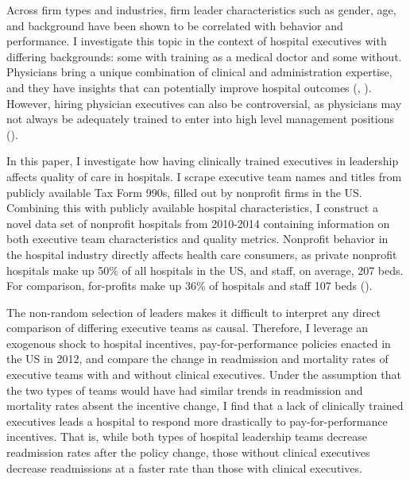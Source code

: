 \documentclass[12pt]{article}
\begin{document}
	\onehalfspacing
	
	\newpage

    Across firm types and industries, firm leader characteristics such as gender, age, and background have been shown to be correlated with behavior and performance. I investigate this topic in the context of hospital executives with differing backgrounds: some with training as a medical doctor and some without. Physicians bring a unique combination of clinical and administration expertise, and they have insights that can potentially improve hospital outcomes (\cite{Stajduhar_2023}, \cite{Ahmed_2022}). However, hiring physician executives can also be controversial, as physicians may not always be adequately trained to enter into high level management positions (\cite{HarvardBusinessReview2018}). 

    In this paper, I investigate how having clinically trained executives in leadership affects quality of care in hospitals. I scrape executive team names and titles from publicly available Tax Form 990s, filled out by nonprofit firms in the US. Combining this with publicly available hospital characteristics, I construct a novel data set of nonprofit hospitals from 2010-2014 containing information on both executive team characteristics and quality metrics. Nonprofit behavior in the hospital industry directly affects health care consumers, as private nonprofit hospitals make up 50\% of all hospitals in the US, and staff, on average, 207 beds. For comparison, for-profits make up 36\% of hospitals and staff 107 beds (\cite{ASPE_2023}). 
    
    The non-random selection of leaders makes it difficult to interpret any direct comparison of differing executive teams as causal. Therefore, I leverage an exogenous shock to hospital incentives, pay-for-performance policies enacted in the US in 2012, and compare the change in readmission and mortality rates of executive teams with and without clinical executives. Under the assumption that the two types of teams would have had similar trends in readmission and mortality rates absent the incentive change, I find that a lack of clinically trained executives leads a hospital to respond more drastically to pay-for-performance incentives. That is, while both types of hospital leadership teams decrease readmission rates after the policy change, those without clinical executives decrease readmissions at a faster rate than those with clinical executives. 
    
\end{document}
